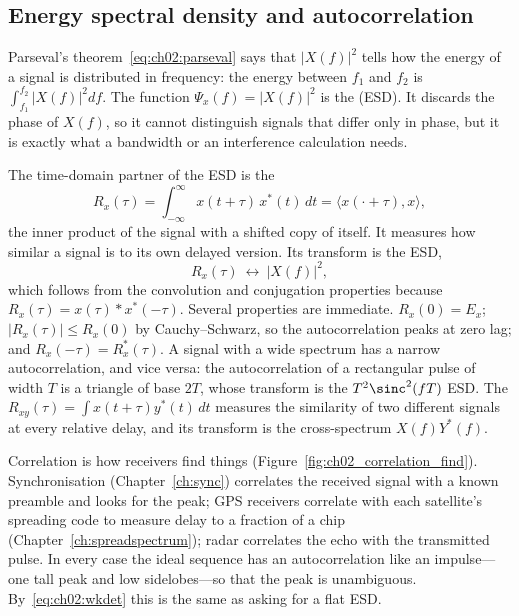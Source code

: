 \subsection{Energy spectral density and autocorrelation}

Parseval's theorem~\eqref{eq:ch02:parseval} says that $|X(f)|^2$ tells how the energy of a signal
is distributed in frequency: the energy between $f_1$ and $f_2$ is $\int_{f_1}^{f_2}|X(f)|^2df$.
The function $\Psi_x(f)=|X(f)|^2$ is the  (ESD). It discards the
phase of $X(f)$, so it cannot distinguish signals that differ only in phase, but it is exactly what a
bandwidth or an interference calculation needs.

The time-domain partner of the ESD is the 
\begin{equation}
R_x(\tau)=\int_{-\infty}^{\infty}x(t+\tau)\,x^*(t)\,dt=\langle x(\cdot+\tau),x\rangle,
\label{eq:ch02:autocorr}
\end{equation}
the inner product of the signal with a shifted copy of itself. It measures how similar a signal
is to its own delayed version. Its transform is the ESD,
\begin{equation}
R_x(\tau)\ \leftrightarrow\ |X(f)|^2 ,
\label{eq:ch02:wkdet}
\end{equation}
which follows from the convolution and conjugation properties because
$R_x(\tau)=x(\tau)*x^*(-\tau)$. Several properties are immediate. $R_x(0)=E_x$; $|R_x(\tau)|\le R_x(0)$
by Cauchy--Schwarz, so the autocorrelation peaks at zero lag; and $R_x(-\tau)=R_x^*(\tau)$. A
signal with a wide spectrum has a narrow autocorrelation, and vice versa: the autocorrelation of a
rectangular pulse of width $T$ is a triangle of base $2T$, whose transform is the $T^2\sinc^2(fT)$
ESD. The  $R_{xy}(\tau)=\int x(t+\tau)y^*(t)\,dt$ measures the similarity of
two different signals at every relative delay, and its transform is the cross-spectrum
$X(f)Y^*(f)$.

Correlation is how receivers find things (Figure~\ref{fig:ch02_correlation_find}). Synchronisation
(Chapter~\ref{ch:sync}) correlates the received signal with a known preamble and looks for the peak;
GPS receivers correlate with each satellite's spreading code to measure delay to a fraction of a chip
(Chapter~\ref{ch:spreadspectrum}); radar correlates the echo with the transmitted pulse. In every case
the ideal sequence has an autocorrelation like an impulse---one tall peak and low sidelobes---so that
the peak is unambiguous. By~\eqref{eq:ch02:wkdet} this is the same as asking for a flat ESD.

